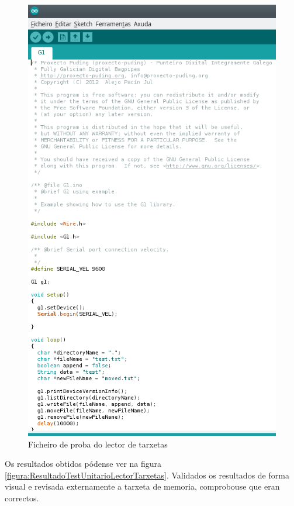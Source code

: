   \begin{figure}[htbp]
   \centering
   \includegraphics[scale=0.8,keepaspectratio=true]{./imagenes/test-lector-tarxetas.png}
   \caption{Ficheiro de proba do lector de tarxetas}
   \label{figura:TestUnitarioLectorTarxetas}
  \end{figure}
  
  Os resultados obtidos pódense ver na figura
  \ref{figura:ResultadoTestUnitarioLectorTarxetas}. Validados os resultados
  de forma visual e revisada externamente a tarxeta de memoria, comprobouse que
  eran correctos. \\
  
